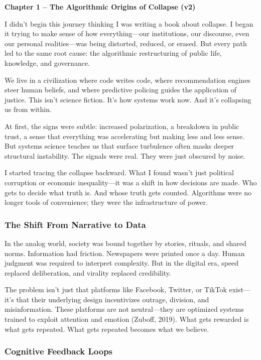 \textbf{Chapter 1 -- The Algorithmic Origins of Collapse (v2)}

I didn't begin this journey thinking I was writing a book about
collapse. I began it trying to make sense of how everything---our
institutions, our discourse, even our personal realities---was being
distorted, reduced, or erased. But every path led to the same root
cause: the algorithmic restructuring of public life, knowledge, and
governance.

We live in a civilization where code writes code, where recommendation
engines steer human beliefs, and where predictive policing guides the
application of justice. This isn't science fiction. It's how systems
work now. And it's collapsing us from within.

At first, the signs were subtle: increased polarization, a breakdown in
public trust, a sense that everything was accelerating but making less
and less sense. But systems science teaches us that surface turbulence
often masks deeper structural instability. The signals were real. They
were just obscured by noise.

I started tracing the collapse backward. What I found wasn't just
political corruption or economic inequality---it was a shift in how
decisions are made. Who gets to decide what truth is. And whose truth
gets counted. Algorithms were no longer tools of convenience; they were
the infrastructure of power.

\subsubsection{The Shift From Narrative to
Data}\label{the-shift-from-narrative-to-data}

In the analog world, society was bound together by stories, rituals, and
shared norms. Information had friction. Newspapers were printed once a
day. Human judgment was required to interpret complexity. But in the
digital era, speed replaced deliberation, and virality replaced
credibility.

The problem isn't just that platforms like Facebook, Twitter, or TikTok
exist---it's that their underlying design incentivizes outrage,
division, and misinformation. These platforms are not neutral---they are
optimized systems trained to exploit attention and emotion (Zuboff,
2019). What gets rewarded is what gets repeated. What gets repeated
becomes what we believe.

\subsubsection{Cognitive Feedback Loops}\label{cognitive-feedback-loops}

